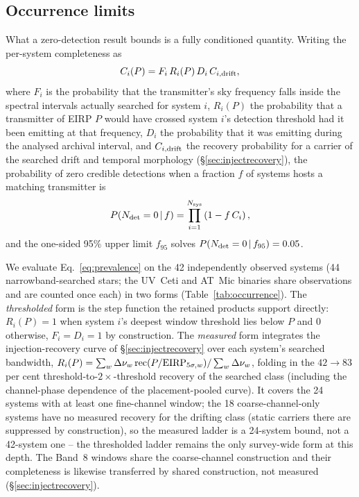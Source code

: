 \documentclass{openjournal}
\begin{document}
\subsection{Occurrence limits}

What a zero-detection result bounds is a fully conditioned quantity.
Writing the per-system completeness as
\begin{equation}
C_i(P) = F_i\,R_i(P)\,D_i\,C_{i,\rm drift},
\label{eq:conditioning}
\end{equation}
where $F_i$ is the probability that the transmitter's sky frequency
falls inside the spectral intervals actually searched for system $i$,
$R_i(P)$ the probability that a transmitter of EIRP $P$ would have
crossed system $i$'s detection threshold had it been emitting at that
frequency, $D_i$ the probability that it was emitting during the analysed
archival interval, and $C_{i,\rm drift}$ the recovery probability for
a carrier of the searched drift and temporal morphology
(\S\ref{sec:injectrecovery}), the probability of zero credible
detections when a fraction $f$ of systems hosts a matching
transmitter is
\begin{equation}
P(N_{\rm det}=0\,|\,f)=\prod_{i=1}^{N_{\rm sys}}\left(1-f\,C_i\right),
\label{eq:prevalence}
\end{equation}
and the one-sided 95\% upper limit $f_{95}$ solves
$P(N_{\rm det}=0\,|\,f_{95})=0.05$.

\noindent{}

\noindent We evaluate Eq.~\ref{eq:prevalence} on the 42 independently
observed systems (44 narrowband-searched stars; the UV~Ceti and
AT~Mic binaries share observations and are counted once each) in two
forms (Table~\ref{tab:occurrence}). The \emph{thresholded} form is
the step function the retained products support directly: $R_i(P)=1$
when system $i$'s deepest window threshold lies below $P$ and 0
otherwise, $F_i=D_i=1$ by construction. The \emph{measured} form
integrates the injection-recovery curve of \S\ref{sec:injectrecovery}
over each system's searched bandwidth,
$R_i(P) = \sum_w \Delta\nu_w\, {\rm rec}(P/{\rm
EIRP}_{5\sigma,w}) / \sum_w \Delta\nu_w$, folding in the
$42\rightarrow83$ per cent threshold-to-$2\times$-threshold recovery
of the searched class (including the channel-phase dependence of
the placement-pooled curve). It covers the 24 systems with at
least one fine-channel window; the 18 coarse-channel-only systems
have no measured recovery for the drifting class (static carriers
there are suppressed by construction), so the measured ladder is a
24-system bound, not a 42-system one -- the thresholded ladder
remains the only survey-wide form at this depth. The Band~8 windows
share the coarse-channel construction and their completeness is
likewise transferred by shared construction, not measured
(\S\ref{sec:injectrecovery}).
\end{document}
